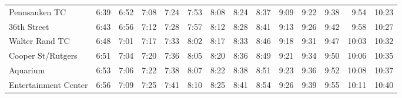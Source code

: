 \begin{center}
\begin{tabular}{@{}lrrrrrrrrrrrrr@{}}
Pennsauken TC & 6:39 & 6:52 & 7:08 & 7:24 & 7:53 & 8:08 & 8:24 & 8:37 & 9:09 & 9:22 & 9:38 & 9:54 & 10:23 \\
36th Street & 6:43 & 6:56 & 7:12 & 7:28 & 7:57 & 8:12 & 8:28 & 8:41 & 9:13 & 9:26 & 9:42 & 9:58 & 10:27 \\
Walter Rand TC & 6:48 & 7:01 & 7:17 & 7:33 & 8:02 & 8:17 & 8:33 & 8:46 & 9:18 & 9:31 & 9:47 & 10:03 & 10:32 \\
Cooper St/Rutgers & 6:51 & 7:04 & 7:20 & 7:36 & 8:05 & 8:20 & 8:36 & 8:49 & 9:21 & 9:34 & 9:50 & 10:06 & 10:35 \\
Aquarium & 6:53 & 7:06 & 7:22 & 7:38 & 8:07 & 8:22 & 8:38 & 8:51 & 9:23 & 9:36 & 9:52 & 10:08 & 10:37 \\
Entertainment Center & 6:56 & 7:09 & 7:25 & 7:41 & 8:10 & 8:25 & 8:41 & 8:54 & 9:26 & 9:39 & 9:55 & 10:11 & 10:40 \\
\bottomrule\end{tabular}\end{center}
